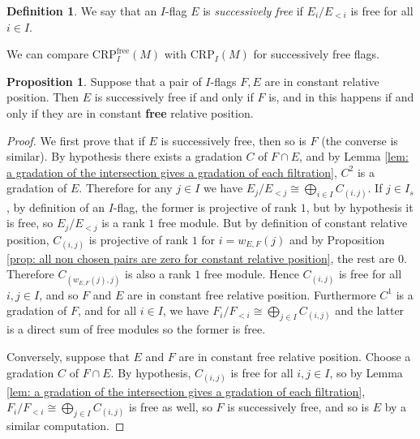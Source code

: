 \documentclass[oneside,11pt]{amsart}
\newcommand{\free}{\ensuremath{\text{free}}}
\newcommand{\CRP}{\ensuremath{\text{CRP}}}
\theoremstyle{definition}
\newtheorem{definition}{Definition}
\newtheorem{proof techniques}{Proof Techniques}
\newtheorem{proposition}{Proposition}
\begin{document}


\begin{definition}
We say that an $I$-flag $E$ is \emph{successively free} if $E_i / E_{<i}$ is free for all $i \in I$. 
\end{definition}

We can compare $\CRP_I^\free(M)$ with $\CRP_I(M)$ for successively free flags. 

\begin{proposition}\label{prop: relative position of successively free flags}
Suppose that a pair of $I$-flags $F , E$ are in constant relative position. Then $E$ is successively free if and only if $F$ is, and in this happens if and only if they are in constant \textbf{free} relative position. 
\end{proposition}

\begin{proof}
We first prove that if $E$ is successively free, then so is $F$ (the converse is similar). By hypothesis there exists a gradation $C$ of $F \cap E$, and by Lemma \ref{lem: a gradation of the intersection gives a gradation of each filtration}, $C^2$ is a gradation of $E$. Therefore for any $j \in I$ we have $E_j / E_{<j} \cong \bigoplus_{i \in I} C_{(i , j)}$. If $j \in I_s$, by definition of an $I$-flag, the former is projective of rank $1$, but by hypothesis it is free, so $E_j / E_{<j}$ is a rank $1$ free module. But by definition of constant relative position, $C_{(i , j)}$ is projective of rank $1$ for $i = w_{E,  F}(j)$ and by Proposition \ref{prop: all non chosen pairs are zero for constant relative position}, the rest are $0$. Therefore $C_{(w_{E, F}(j) , j )}$ is also a rank $1$ free module. Hence $C_{(i , j)}$ is free for all $i , j \in I$, and so $F$ and $E$ are in constant free relative position. Furthermore $C^1$ is a gradation of $F$, and for all $i \in I$, we have $F_i / F_{<i} \cong \bigoplus_{j \in I} C_{(i , j)}$ and the latter is a direct sum of free modules so the former is free. 

Conversely, suppose that $E$ and $F$ are in constant free relative position. Choose a gradation $C$ of $F \cap E$. By hypothesis, $C_{(i , j)}$ is free for all $i , j \in I$, so by Lemma \ref{lem: a gradation of the intersection gives a gradation of each filtration}, $F_i / F_{<i} \cong \bigoplus_{j \in I} C_{(i , j)}$ is free as well, so $F$ is successively free, and so is $E$ by a similar computation. 

\end{proof}
\end{document}
